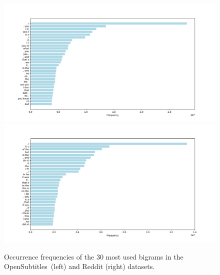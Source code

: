 \begin{figure}[H]
	\includegraphics[width=\linewidth]{img/opensubtitles_bigram_top_30_freq}
	\centering
	\small
	\endminipage\hfill
	\includegraphics[width=\linewidth]{img/reddit_bigram_top_30_freq}
	\centering
	\small
	\endminipage\hfill
	\caption{Occurrence frequencies of the 30 most used bigrams in the OpenSubtitles~(left) and Reddit (right) datasets.}
	\label{data:ngram:freq_top_30}
\end{figure}

